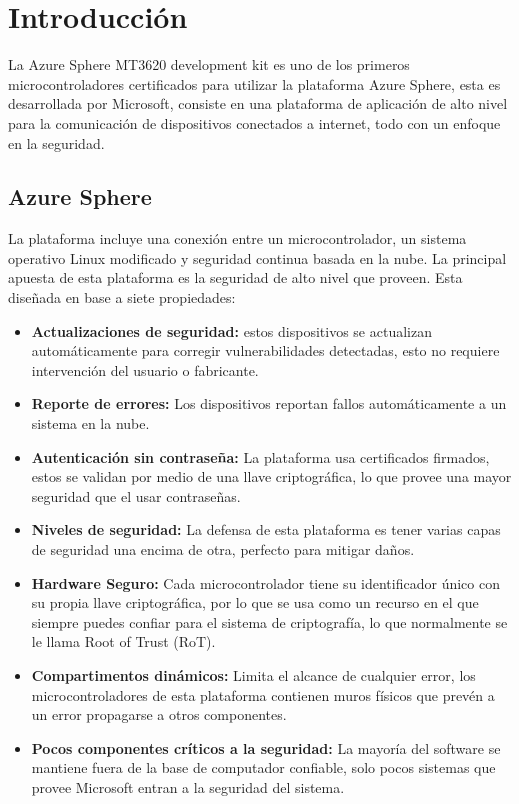 \section{Introducción}

La Azure Sphere MT3620 development kit es uno de los primeros microcontroladores certificados para utilizar la plataforma Azure Sphere, esta es desarrollada por Microsoft, consiste en una plataforma de aplicación de alto nivel para la comunicación de dispositivos conectados a internet, todo con un enfoque en la seguridad.
\subsection{Azure Sphere}
La plataforma incluye una conexión entre un microcontrolador, un sistema operativo Linux modificado y seguridad continua basada en la nube.
La principal apuesta de esta plataforma es la seguridad de alto nivel que proveen. Esta diseñada en base a siete propiedades:
\begin{itemize}
	\item 
	\textbf{Actualizaciones de seguridad:} estos dispositivos se actualizan automáticamente para corregir vulnerabilidades detectadas, esto no requiere intervención del usuario o fabricante.
	\item 
	\textbf{Reporte de errores:} Los dispositivos reportan fallos automáticamente a un sistema en la nube.
	\item
	\textbf{Autenticación sin contraseña:} La plataforma usa certificados firmados, estos se validan por medio de una llave criptográfica, lo que provee una mayor seguridad que el usar contraseñas.
	\item
	\textbf{Niveles de seguridad:} La defensa de esta plataforma es tener varias capas de seguridad una encima de otra, perfecto para mitigar daños.
	\item
	\textbf{Hardware Seguro:} Cada microcontrolador tiene su identificador único con su propia llave criptográfica, por lo que se usa como un recurso en el que siempre puedes confiar para el sistema de criptografía, lo que normalmente se le llama Root of Trust (RoT).
	\item
	\textbf{Compartimentos dinámicos:} Limita el alcance de cualquier error, los microcontroladores de esta plataforma contienen muros físicos que prevén a un error propagarse a otros componentes.
	\item
	\textbf{Pocos componentes críticos a la seguridad:} La mayoría del software se mantiene fuera de la base de computador confiable, solo pocos sistemas que provee Microsoft entran a la seguridad del sistema.
\end{itemize}